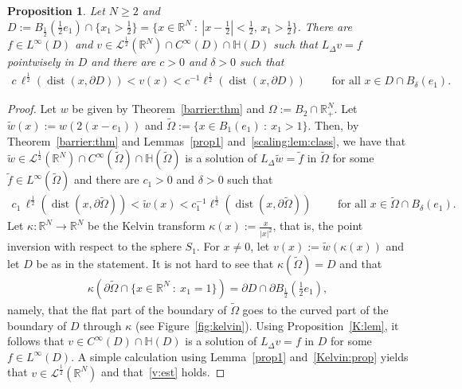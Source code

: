 \documentclass[11pt]{article}
\newcommand{\R}{\mathbb{R}}
\numberwithin{equation}{section}
\newtheorem{proposition}[theorem]{Proposition}
\newcommand{\cL}{{\mathcal L}}
\begin{document}
\begin{proposition}\label{v:barrier:prop}
Let $N\geq 2$ and $D:=B_{\frac{1}{2}}(\frac{1}{2}e_1)\cap\{x_1>\frac{1}{2}\}=\{x\in\R^N\::\: |x-\frac{1}{2}|<\frac{1}{2},\, x_1>\frac{1}{2}\}$. There are $f\in L^\infty(D)$ and $v\in \cL^{\frac{1}{2}}(\R^N)\cap C^\infty(D)\cap {\mathbb H}(D)$ such that $L_\Delta v= f$ pointwisely in $D$ and there are $c>0$ and $\delta>0$ such that
\begin{align}\label{v:est}
c\,\ell^{\frac{1}{2}}(\operatorname{dist}(x,\partial D)) < v(x)<c^{-1}\ell^{\frac{1}{2}}(\operatorname{dist}(x,\partial D))\qquad \text{ for all }x\in D\cap B_\delta(e_1).
\end{align}
\end{proposition}
\begin{proof}Let $w$ be given by Theorem~\ref{barrier:thm} and $\Omega:=B_2\cap \R^N_+$. Let $\widetilde w(x):=w(2(x-e_1))$ and $\widetilde \Omega:=\{x\in B_1(e_1)\::\: x_1>1\}$. Then, by Theorem~\ref{barrier:thm} and Lemmas~\ref {prop1} and~\ref{scaling:lem:class}, we have that $\widetilde w\in \cL^{\frac{1}{2}}(\R^N)\cap C^\infty(\widetilde \Omega)\cap {\mathbb H}(\widetilde \Omega)$ is a solution of $L_\Delta \widetilde w= \widetilde f$ in $\widetilde \Omega$ for some $\widetilde f\in L^\infty(\widetilde \Omega)$  and there are $c_1>0$ and $\delta>0$ such that
\begin{align*}
c_1\,\ell^{\frac{1}{2}}(\operatorname{dist}(x,\partial \widetilde\Omega)) < \widetilde w(x) <c_1^{-1}\ell^{\frac{1}{2}}(\operatorname{dist}(x,\partial \widetilde\Omega))\qquad \text{ for all }x\in \widetilde \Omega\cap B_\delta(e_1).
\end{align*}
Let $\kappa:\R^N\to\R^N$ be the Kelvin transform $\kappa(x):=\frac{x}{|x|^2}$, that is, the point inversion with respect to the sphere $S_1$. For $x\neq 0$, let $v(x):=\widetilde w(\kappa(x))$ and let $D$ be as in the statement.  It is not hard to see that $\kappa(\widetilde\Omega)=D$ and that
\begin{align*}
\kappa(\partial \widetilde\Omega\cap \{x\in \R^N\::\: x_1=1\})=\partial D\cap \partial B_\frac{1}{2}(\tfrac{1}{2}e_1),
\end{align*}
namely, that the flat part of the boundary of $\widetilde\Omega$ goes to the curved part of the boundary of $D$ through $\kappa$ (see Figure~\ref{fig:kelvin}).  Using Proposition~\ref{K:lem}, it follows that $v\in C^\infty(D)\cap {\mathbb H}(D)$ is a solution of $L_\Delta v= f$ in $D$ for some $f\in L^\infty(D).$  A simple calculation using Lemma~\ref{prop1} and~\eqref{Kelvin:prop} yields that $v\in\cL^{\frac{1}{2}}(\R^N)$ and that~\eqref{v:est} holds.
\end{proof}
\end{document}
